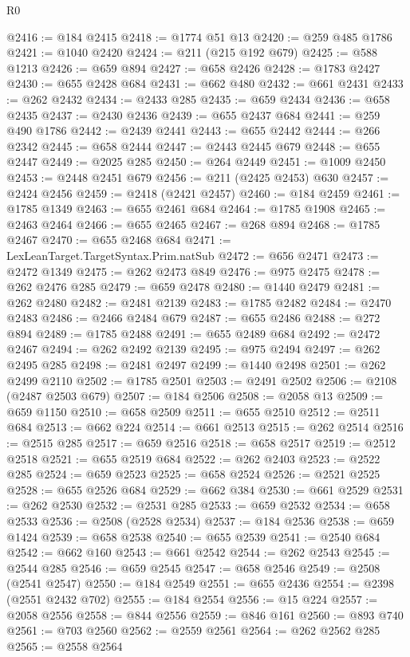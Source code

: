 \begin{lexlean}{R0}
\begin{coremodule}
@2416 := @184 @2415
@2418 := @1774 @51 @13
@2420 := @259 @485 @1786
@2421 := @1040 @2420
@2424 := @211 (@215 @192 @679)
@2425 := @588 @1213
@2426 := @659 @894
@2427 := @658 @2426
@2428 := @1783 @2427
@2430 := @655 @2428 @684
@2431 := @662 @480
@2432 := @661 @2431
@2433 := @262 @2432
@2434 := @2433 @285
@2435 := @659 @2434
@2436 := @658 @2435
@2437 := @2430 @2436
@2439 := @655 @2437 @684
@2441 := @259 @490 @1786
@2442 := @2439 @2441
@2443 := @655 @2442
@2444 := @266 @2342
@2445 := @658 @2444
@2447 := @2443 @2445 @679
@2448 := @655 @2447
@2449 := @2025 @285
@2450 := @264 @2449
@2451 := @1009 @2450
@2453 := @2448 @2451 @679
@2456 := @211 (@2425 @2453) @630
@2457 := @2424 @2456
@2459 := @2418 (@2421 @2457)
@2460 := @184 @2459
@2461 := @1785 @1349
@2463 := @655 @2461 @684
@2464 := @1785 @1908
@2465 := @2463 @2464
@2466 := @655 @2465
@2467 := @268 @894
@2468 := @1785 @2467
@2470 := @655 @2468 @684
@2471 := LexLeanTarget.TargetSyntax.Prim.natSub
@2472 := @656 @2471
@2473 := @2472 @1349
@2475 := @262 @2473 @849
@2476 := @975 @2475
@2478 := @262 @2476 @285
@2479 := @659 @2478
@2480 := @1440 @2479
@2481 := @262 @2480
@2482 := @2481 @2139
@2483 := @1785 @2482
@2484 := @2470 @2483
@2486 := @2466 @2484 @679
@2487 := @655 @2486
@2488 := @272 @894
@2489 := @1785 @2488
@2491 := @655 @2489 @684
@2492 := @2472 @2467
@2494 := @262 @2492 @2139
@2495 := @975 @2494
@2497 := @262 @2495 @285
@2498 := @2481 @2497
@2499 := @1440 @2498
@2501 := @262 @2499 @2110
@2502 := @1785 @2501
@2503 := @2491 @2502
@2506 := @2108 (@2487 @2503 @679)
@2507 := @184 @2506
@2508 := @2058 @13
@2509 := @659 @1150
@2510 := @658 @2509
@2511 := @655 @2510
@2512 := @2511 @684
@2513 := @662 @224
@2514 := @661 @2513
@2515 := @262 @2514
@2516 := @2515 @285
@2517 := @659 @2516
@2518 := @658 @2517
@2519 := @2512 @2518
@2521 := @655 @2519 @684
@2522 := @262 @2403
@2523 := @2522 @285
@2524 := @659 @2523
@2525 := @658 @2524
@2526 := @2521 @2525
@2528 := @655 @2526 @684
@2529 := @662 @384
@2530 := @661 @2529
@2531 := @262 @2530
@2532 := @2531 @285
@2533 := @659 @2532
@2534 := @658 @2533
@2536 := @2508 (@2528 @2534)
@2537 := @184 @2536
@2538 := @659 @1424
@2539 := @658 @2538
@2540 := @655 @2539
@2541 := @2540 @684
@2542 := @662 @160
@2543 := @661 @2542
@2544 := @262 @2543
@2545 := @2544 @285
@2546 := @659 @2545
@2547 := @658 @2546
@2549 := @2508 (@2541 @2547)
@2550 := @184 @2549
@2551 := @655 @2436
@2554 := @2398 (@2551 @2432 @702)
@2555 := @184 @2554
@2556 := @15 @224
@2557 := @2058 @2556
@2558 := @844 @2556
@2559 := @846 @161
@2560 := @893 @740
@2561 := @703 @2560
@2562 := @2559 @2561
@2564 := @262 @2562 @285
@2565 := @2558 @2564

\end{coremodule}
\end{lexlean}
